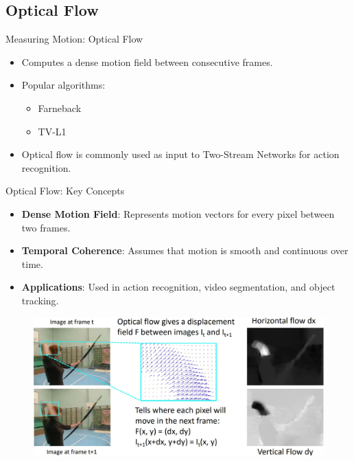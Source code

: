 \subsection{Optical Flow}
\begin{frame}{Measuring Motion: Optical Flow}
    \begin{itemize}
        \item Computes a dense motion field between consecutive frames.
        \item Popular algorithms:
        \begin{itemize}
            \item Farneback
            \item TV-L1
        \end{itemize}
        \item Optical flow is commonly used as input to Two-Stream Networks for action recognition.
    \end{itemize}
\end{frame}

\begin{frame}[allowframebreaks]{Optical Flow: Key Concepts}
    \begin{itemize}
        \item \textbf{Dense Motion Field}: Represents motion vectors for every pixel between two frames.
        \item \textbf{Temporal Coherence}: Assumes that motion is smooth and continuous over time.
        \item \textbf{Applications}: Used in action recognition, video segmentation, and object tracking.
    \end{itemize}
\framebreak
    \begin{figure}
        \centering
        \includegraphics[width=1\textwidth,height=0.9\textheight,keepaspectratio]{images/video/slide_22_1_img.jpg}
    \end{figure}
\end{frame}